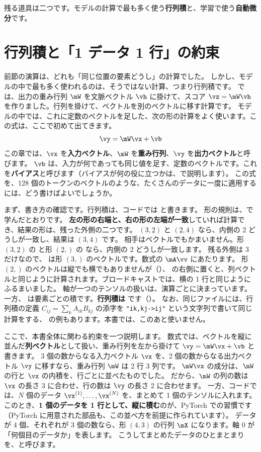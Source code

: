 残る道具は二つです。モデルの計算で最も多く使う\textbf{行列積}と、学習で使う\textbf{自動微分}です。

\section{行列積と「1 データ 1 行」の約束}\label{sec:pt-matmul}

前節の演算は、どれも「同じ位置の要素どうし」の計算でした。
しかし、モデルの中で最も多く使われるのは、そうではない計算、つまり行列積です。
では、出力の重み行列 $\mW$ を文脈ベクトル $\vh$ に掛けて、スコア $\vz=\mW\vh$ を作りました。行列を掛けて、ベクトルを別のベクトルに移す計算です。
モデルの中では、これに定数のベクトルを足した、次の形の計算をよく使います。この式は、ここで初めて出てきます。
\[
\vy=\mW\vx+\vb
\]
この章では、$\vx$ を\textbf{入力ベクトル}、$\mW$ を\textbf{重み行列}、$\vy$ を\textbf{出力ベクトル}と呼びます。
$\vb$ は、入力が何であっても同じ値を足す、定数のベクトルです。これを\textbf{バイアス}と呼びます（バイアスが何の役に立つかは、で説明します）。
この式を、128 個のトークンのベクトルのような、たくさんのデータに一度に適用するには、どう書けばよいでしょうか。

まず、書き方の確認です。行列積は、コードでは  と書きます。
形の規則は、で学んだとおりです。
\textbf{左の形の右端と、右の形の左端が一致}していれば計算でき、結果の形は、残った外側の二つです。
$(3,\underline{2})$ と $(\underline{2},4)$ なら、内側の 2 どうしが一致し、結果は $(3,4)$ です。
相手はベクトルでもかまいません。形 $(3,\underline{2})$ の  と形 $(\underline{2},)$ の  なら、内側の 2 どうしが一致します。
残る外側は 3 だけなので、 は形 $(3,)$ のベクトルです。数式の $\mA\vv$ にあたります。
形 $(2,)$ のベクトルは縦でも横でもありませんが（）、 の右側に置くと、列ベクトルと同じように計算されます。ブロードキャストでは、横の 1 行と同じようにふるまいました。
軸が一つのテンソルの扱いは、演算ごとに決まっています。
一方、 は要素ごとの積です。\textbf{行列積は } です（）。
なお、同じファイルには、行列積の定義 $C_{ij}=\sum_{k}A_{ik}B_{kj}$ の添字を \texttt{"ik,kj->ij"} という文字列で書いて同じ計算をする、 の例もあります。本書では、このあと使いません。

ここで、本書全体に関わる約束を一つ説明します。
数式では、ベクトルを縦に並んだ\textbf{列ベクトル}として扱い、重み行列を左から掛けて $\vy=\mW\vx+\vb$ と書きます。
3 個の数からなる入力ベクトル $\vx$ を、2 個の数からなる出力ベクトル $\vy$ に移すなら、重み行列 $\mW$ は 2 行 3 列です。
$\mW\vx$ の成分は、$\mW$ の行と $\vx$ の内積を、行ごとに並べたものでした。
だから、$\mW$ の列の数は $\vx$ の長さ 3 に合わせ、行の数は $\vy$ の長さ 2 に合わせます。
一方、コードでは、$N$ 個のデータ $\vx^{(1)},\dots,\vx^{(N)}$ を、まとめて 1 個のテンソルに入れます。
このとき、\textbf{1 個のデータを 1 行として、縦に積む}のが、PyTorch での習慣です（PyTorch に用意された部品も、この並べ方を前提に作られています）。
データが 4 個、それぞれが 3 個の数なら、形 $(4,3)$ の行列 $\mX$ になります。軸 0 が「何個目のデータか」を表します。
こうしてまとめたデータのひとまとまりを、と呼びます。

